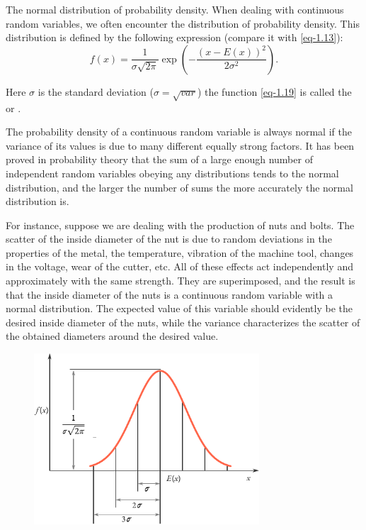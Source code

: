 The normal distribution of probability density. When dealing with
continuous random variables, we often encounter the 
distribution of probability density. This distribution is defined by the
following expression (compare it with \eqref{eq-1.13}):
\begin{equation}
f(x) = \frac{1}{\sigma \sqrt{2 \pi}} \exp \left( - \frac{(x - E(x))^2}{2 \sigma ^{2}}\right).
\label{eq-1.19}
\end{equation}

Here $\sigma$ is the standard deviation ($\sigma = \sqrt{var}$) the
function \eqref{eq-1.19} is called the  or .

The probability density of a continuous random variable is always
normal if the variance of its values is due to many different equally
strong factors. It has been proved in probability theory that the sum of
a large enough number of independent random variables obeying any
distributions tends to the normal distribution, and the larger the number
of sums the more accurately the normal distribution is.



For instance, suppose we are dealing with the production of nuts and
bolts. The scatter of the inside diameter of the nut is due to random
deviations in the properties of the metal, the temperature, vibration of
the machine tool, changes in the voltage, wear of the cutter, etc. All of
these effects act independently and approximately with the same
strength. They are superimposed, and the result is that the inside
diameter of the nuts is a continuous random variable with a normal
distribution. The expected value of this variable should evidently be the
desired inside diameter of the nuts, while the variance characterizes the
scatter of the obtained diameters around the desired value.


\begin{figure}[!ht]
 \centering
 \includegraphics[width=0.75\textwidth]{figures/three-sigma.pdf}
 \end{figure}



